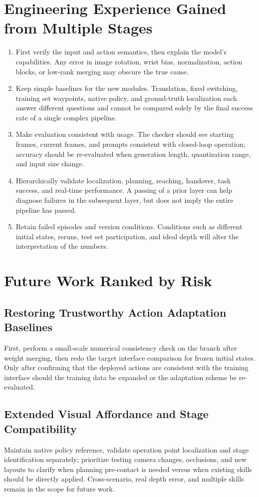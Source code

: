 \section{Engineering Experience Gained from Multiple Stages}
\begin{enumerate}
\item First verify the input and action semantics, then explain the model's capabilities. Any error in image rotation, wrist bias, normalization, action blocks, or low-rank merging may obscure the true cause.
\item Keep simple baselines for the new modules. Translation, fixed switching, training set waypoints, native policy, and ground-truth localization each answer different questions and cannot be compared solely by the final success rate of a single complex pipeline.
\item Make evaluation consistent with usage. The checker should see starting frames, current frames, and prompts consistent with closed-loop operation; accuracy should be re-evaluated when generation length, quantization range, and input size change.
\item Hierarchically validate localization, planning, reaching, handover, task success, and real-time performance. A passing of a prior layer can help diagnose failures in the subsequent layer, but does not imply the entire pipeline has passed.
\item Retain failed episodes and version conditions. Conditions such as different initial states, reruns, test set participation, and ideal depth will alter the interpretation of the numbers.
\end{enumerate}
\section{Future Work Ranked by Risk}
\subsection{Restoring Trustworthy Action Adaptation Baselines}
First, perform a small-scale numerical consistency check on the branch after weight merging, then redo the target interface comparison for frozen initial states. Only after confirming that the deployed actions are consistent with the training interface should the training data be expanded or the adaptation scheme be re-evaluated.
\subsection{Extended Visual Affordance and Stage Compatibility}
Maintain native policy reference, validate operation point localization and stage identification separately; prioritize testing camera changes, occlusions, and new layouts to clarify when planning pre-contact is needed versus when existing skills should be directly applied. Cross-scenario, real depth error, and multiple skills remain in the scope for future work.
